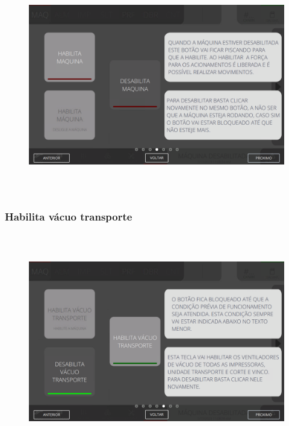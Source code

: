 \begin{figure}[h]
  \centering
  \includegraphics[width=576px,height=360px]{src/imagesFlexo/02-machine/e-4.png}
\end{figure}

\vspace*{\fill}

\newpage
\thispagestyle{fancy}

\vspace*{40 pt}

\subsubsection{\small{Habilita vácuo transporte}}

\vspace*{\fill}

\begin{figure}[h]
  \centering
  \includegraphics[width=576px,height=360px]{src/imagesFlexo/02-machine/e-5.png}
\end{figure}

